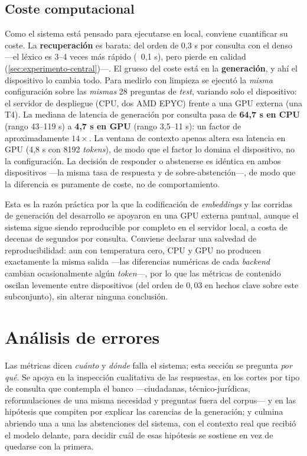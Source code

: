 \subsection{Coste computacional}
\label{subsec:gen-coste}

Como el sistema está pensado para ejecutarse en local, conviene cuantificar su coste. La \textbf{recuperación} es barata: del orden de 0,3 s por consulta con el denso —el léxico es 3--4 veces más rápido (~0,1 s), pero pierde en calidad (\ref{sec:experimento-central})—. El grueso del coste está en la \textbf{generación}, y ahí el dispositivo lo cambia todo. Para medirlo con limpieza se ejecutó la \emph{misma} configuración sobre las \emph{mismas} 28 preguntas de \emph{test}, variando solo el dispositivo: el servidor de despliegue (CPU, dos AMD EPYC) frente a una GPU externa (una T4). La mediana de latencia de generación por consulta pasa de \textbf{64,7 s en CPU} (rango 43--119 s) a \textbf{4,7 s en GPU} (rango 3,5--11 s): un factor de aproximadamente $14\times$. La ventana de contexto apenas altera esa latencia en GPU (4,8 s con 8192 \emph{tokens}), de modo que el factor lo domina el dispositivo, no la configuración. La decisión de responder o abstenerse es idéntica en ambos dispositivos —la misma tasa de respuesta y de sobre-abstención—, de modo que la diferencia es puramente de coste, no de comportamiento.

Esta es la razón práctica por la que la codificación de \emph{embeddings} y las corridas de generación del desarrollo se apoyaron en una GPU externa puntual, aunque el sistema sigue siendo reproducible por completo en el servidor local, a costa de decenas de segundos por consulta. Conviene declarar una salvedad de reproducibilidad: aun con temperatura cero, CPU y GPU no producen exactamente la misma salida —las diferencias numéricas de cada \emph{backend} cambian ocasionalmente algún \emph{token}—, por lo que las métricas de contenido oscilan levemente entre dispositivos (del orden de $0{,}03$ en hechos clave sobre este subconjunto), sin alterar ninguna conclusión.

\section{Análisis de errores}
\label{sec:analisis-errores}

Las métricas dicen \emph{cuánto} y \emph{dónde} falla el sistema; esta sección se pregunta \emph{por qué}. Se apoya en la inspección cualitativa de las respuestas, en los cortes por tipo de consulta que contempla el banco —ciudadanas, técnico-jurídicas, reformulaciones de una misma necesidad y preguntas fuera del corpus— y en las hipótesis que compiten por explicar las carencias de la generación; y culmina abriendo una a una las abstenciones del sistema, con el contexto real que recibió el modelo delante, para decidir cuál de esas hipótesis se sostiene en vez de quedarse con la primera.

